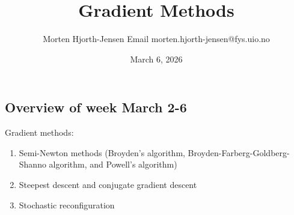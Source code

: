 \documentclass[%
oneside,                 %
final,                   %
10pt]{article}
\begin{document}

\newcommand{\exercisesection}[1]{\subsection*{#1}}






\title{Gradient Methods}


\author{Morten Hjorth-Jensen  Email morten.hjorth-jensen@fys.uio.no}

\date{March 6, 2026
}

\subsection{Overview of week March 2-6}
\begin{block}{Gradient methods: }
\begin{enumerate}
\item Semi-Newton methods (Broyden's algorithm, Broyden-Farberg-Goldberg-Shanno algorithm, and Powell's algorithm)

\item Steepest descent and conjugate gradient descent

\item Stochastic reconfiguration
\end{enumerate}

\noindent
\end{block}

\end{document}
